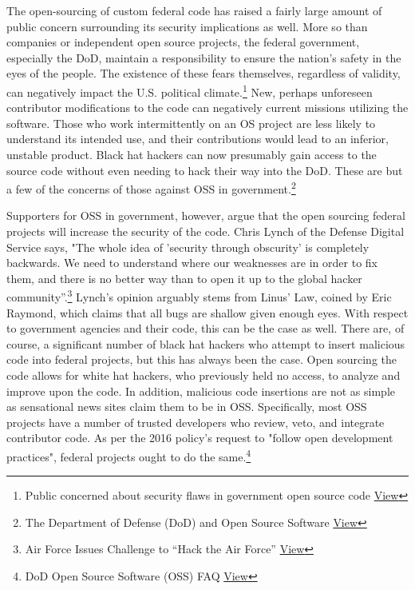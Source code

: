 \documentclass[a4paper]{article}
\begin{document}
    The open-sourcing of custom federal code has raised a fairly large amount of public concern surrounding its security implications as well. More so than companies or independent open source projects, the federal government, especially the DoD, maintain a responsibility to ensure the nation's safety in the eyes of the people. The existence of these fears themselves, regardless of validity, can negatively impact the U.S. political climate.\footnote{Public concerned about security flaws in government open source code \href{https://www.csoonline.com/article/3047641/open-source-tools/public-concerned-about-security-flaws-in-government-open-source-code.html}{View}} New, perhaps unforeseen contributor modifications to the code can negatively current missions utilizing the software. Those who work intermittently on an OS project are less likely to understand its intended use, and their contributions would lead to an inferior, unstable product. Black hat hackers can now presumably gain access to the source code without even needing to hack their way into the DoD. These are but a few of the concerns of those against OSS in government.\footnote{The Department of Defense (DoD) and Open Source Software \href{http://www.oracle.com/us/products/middleware/cloud-app-foundation/weblogic/dod-and-open-source-software-2012277.pdf}{View}}

    Supporters for OSS in government, however, argue that the open sourcing federal projects will increase the security of the code. Chris Lynch of the Defense Digital Service says, "The whole idea of 'security through obscurity' is completely backwards. We need to understand where our weaknesses are in order to fix them, and there is no better way than to open it up to the global hacker community”.\footnote{Air Force Issues Challenge to “Hack the Air Force” \href{https://www.defense.gov/News/News-Releases/News-Release-View/Article/1164012/air-force-issues-challenge-to-hack-the-air-force/}{View}} Lynch's opinion arguably stems from Linus' Law, coined by Eric Raymond, which claims that all bugs are shallow given enough eyes. With respect to government agencies and their code, this can be the case as well. There are, of course, a significant number of black hat hackers who attempt to insert malicious code into federal projects, but this has always been the case. Open sourcing the code allows for white hat hackers, who previously held no access, to analyze and improve upon the code. In addition, malicious code insertions are not as simple as sensational news sites claim them to be in OSS. Specifically, most OSS projects have a number of trusted developers who review, veto, and integrate contributor code. As per the 2016 policy's request to "follow open development practices", federal projects ought to do the same.\footnote{DoD Open Source Software (OSS) FAQ \href{http://dodcio.defense.gov/Open-Source-Software-FAQ//\#Frequently\_Asked\_Questions\_regarding\_Open\_Source\_Software\_.28OSS.29\_and\_the\_Department\_of\_Defense\_.28DoD.29}{View}}
\end{document}
